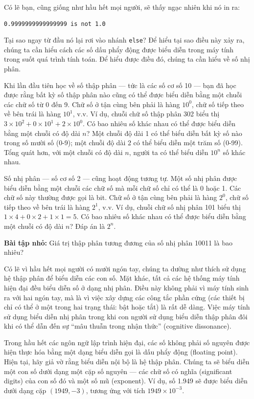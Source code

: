 Có lẽ bạn, cũng giống như hầu hết mọi người, sẽ thấy ngạc nhiên khi nó in ra:

\begin{verbatim}
0.9999999999999999 is not 1.0
\end{verbatim}

Tại sao ngay từ đầu nó lại rơi vào nhánh \texttt{else}? Để hiểu tại sao điều này xảy ra, chúng ta cần hiểu cách các số dấu phẩy động được biểu diễn trong máy tính trong suốt quá trình tính toán. Để hiểu được điều đó, chúng ta cần hiểu về số nhị phân.

Khi lần đầu tiên học về số thập phân — tức là các số cơ số 10 — bạn đã học được rằng bất kỳ số thập phân nào cũng có thể được biểu diễn bằng một chuỗi các chữ số từ 0 đến 9. Chữ số ở tận cùng bên phải là hàng $10^0$, chữ số tiếp theo về bên trái là hàng $10^1$, v.v. Ví dụ, chuỗi chữ số thập phân 302 biểu thị $3 \times 10^2 + 0 \times 10^1 + 2 \times 10^0$. Có bao nhiêu số khác nhau có thể được biểu diễn bằng một chuỗi có độ dài $n$? Một chuỗi độ dài 1 có thể biểu diễn bất kỳ số nào trong số mười số (0-9); một chuỗi độ dài 2 có thể biểu diễn một trăm số (0-99). Tổng quát hơn, với một chuỗi có độ dài $n$, người ta có thể biểu diễn $10^n$ số khác nhau.

Số nhị phân — số cơ số 2 — cũng hoạt động tương tự. Một số nhị phân được biểu diễn bằng một chuỗi các chữ số mà mỗi chữ số chỉ có thể là 0 hoặc 1. Các chữ số này thường được gọi là bit. Chữ số ở tận cùng bên phải là hàng $2^0$, chữ số tiếp theo về bên trái là hàng $2^1$, v.v. Ví dụ, chuỗi chữ số nhị phân 101 biểu thị $1 \times 4 + 0 \times 2 + 1 \times 1 = 5$. Có bao nhiêu số khác nhau có thể được biểu diễn bằng một chuỗi có độ dài $n$? Đáp án là $2^n$.

\noindent \textbf{Bài tập nhỏ:} Giá trị thập phân tương đương của số nhị phân 10011 là bao nhiêu?

Có lẽ vì hầu hết mọi người có mười ngón tay, chúng ta dường như thích sử dụng hệ thập phân để biểu diễn các con số. Mặt khác, tất cả các hệ thống máy tính hiện đại đều biểu diễn số ở dạng nhị phân. Điều này không phải vì máy tính sinh ra với hai ngón tay, mà là vì việc xây dựng các công tắc phần cứng (các thiết bị chỉ có thể ở một trong hai trạng thái: bật hoặc tắt) là rất dễ dàng. Việc máy tính sử dụng biểu diễn nhị phân trong khi con người sử dụng biểu diễn thập phân đôi khi có thể dẫn đến sự ``mâu thuẫn trong nhận thức'' (cognitive dissonance).

Trong hầu hết các ngôn ngữ lập trình hiện đại, các số không phải số nguyên được hiện thực hóa bằng một dạng biểu diễn gọi là dấu phẩy động (floating point). Hiện tại, hãy giả vờ rằng biểu diễn nội bộ là hệ thập phân. Chúng ta sẽ biểu diễn một con số dưới dạng một cặp số nguyên — các chữ số có nghĩa (significant digits) của con số đó và một số mũ (exponent). Ví dụ, số 1.949 sẽ được biểu diễn dưới dạng cặp $(1949, -3)$, tương ứng với tích $1949 \times 10^{-3}$.

